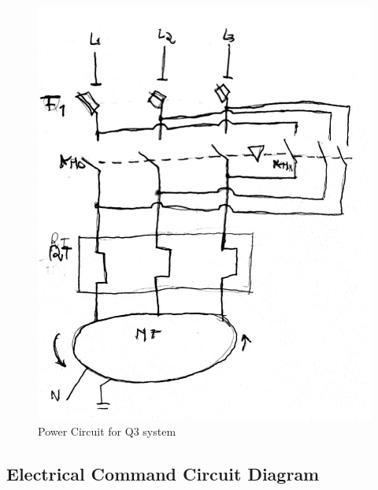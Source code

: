 \begin{figure}[H]
    \includegraphics[width=16cm]{Images/Q3/Q3_power.jpeg}
    \centering
    \caption{Power Circuit for Q3 system}
    \label{fig:Q3_power}
\end{figure}

\subsection{Electrical Command Circuit Diagram} \label{sec:Electrical_Command_Circuit_Diagram}

